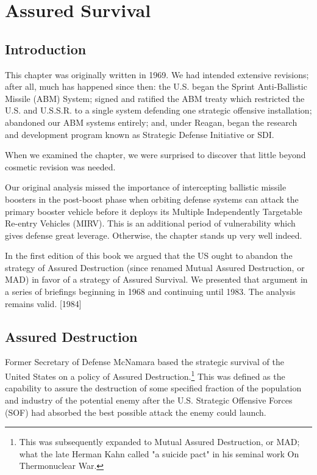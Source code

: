 \chapter{Assured Survival}
\section{Introduction}

\begin{mdframed}[backgroundcolor=black!10]
This chapter was originally written in 1969. We had intended extensive revisions; after all, much has happened since then: the U.S. began the Sprint Anti-Ballistic Missile (ABM) System; signed and ratified the ABM treaty which restricted the U.S. and U.S.S.R. to a single system defending one strategic offensive installation; abandoned our ABM systems entirely; and, under Reagan, began the research and development program known as Strategic Defense Initiative or SDI.

When we examined the chapter, we were surprised to discover that little beyond cosmetic revision was needed.

Our original analysis missed the importance of intercepting ballistic missile boosters in the post-boost phase when orbiting defense systems can attack the primary booster vehicle before it deploys its Multiple Independently Targetable Re-entry Vehicles (MIRV). This is an additional period of vulnerability which gives defense great leverage. Otherwise, the chapter stands up very well indeed.

In the first edition of this book we argued that the US ought to abandon the strategy of Assured Destruction (since renamed Mutual Assured Destruction, or MAD) in favor of a strategy of Assured Survival. We presented that argument in a series of briefings beginning in 1968 and continuing until 1983. The analysis remains valid. [1984]
\end{mdframed}

\section{Assured Destruction}
Former Secretary of Defense McNamara based the strategic survival of the United States on a policy of Assured Destruction.\footnote{This was subsequently expanded to Mutual Assured Destruction, or MAD; what the late Herman Kahn called "a suicide pact" in his seminal work On Thermonuclear War.} This was defined as the capability to assure the destruction of some specified fraction of the population and industry of the potential enemy after the U.S. Strategic Offensive Forces (SOF) had absorbed the best possible attack the enemy could launch.

